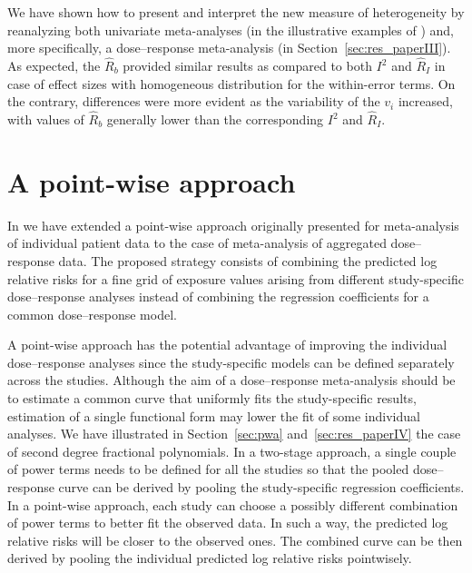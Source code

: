 \documentclass[11pt,a4paper,twoside,openany]{book}\usepackage{knitr}
\begin{document}
{{We have shown how to present and interpret the new measure of heterogeneity by reanalyzing both univariate meta-analyses (in the illustrative examples of ) and, more specifically, a dose--response meta-analysis (in Section~\ref{sec:res_paperIII}). As expected, the $\hat R_b$ provided similar results as compared to both $I^2$ and $\hat R_I$ in case of effect sizes with homogeneous distribution for the within-error terms. On the contrary, differences were more evident as the variability of the $v_i$ increased, with values of $\hat R_b$ generally lower than the corresponding $I^2$ and $\hat R_I$.


\section{A point-wise approach}

In  we have extended a point-wise approach originally presented for meta-analysis of individual patient data to the case of meta-analysis of aggregated dose--response data.  The proposed strategy consists of combining the predicted log relative risks for a fine grid of exposure values arising from different study-specific dose--response analyses instead of combining the regression coefficients for a common dose--response model.

A point-wise approach has the potential advantage of improving the individual dose--response analyses since the study-specific models can be defined separately across the studies. Although the aim of a dose--response meta-analysis should be to estimate a common curve that uniformly fits the study-specific results, estimation of a single functional form may lower the fit of some individual analyses. We have illustrated in Section~\ref{sec:pwa} and~\ref{sec:res_paperIV} the case of second degree fractional polynomials. In a two-stage approach, a single couple of power terms needs to be defined for all the studies so that the pooled dose--response curve can be derived by pooling the study-specific regression coefficients. In a point-wise approach, each study can choose a possibly different combination of power terms to better fit the observed data. In such a way, the predicted log relative risks will be closer to the observed ones. The combined curve can be then derived by pooling the individual predicted log relative risks pointwisely.

}}
\end{document}
